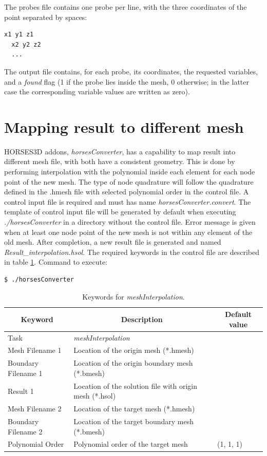 \documentclass[a4paper,10pt]{report}
\begin{document}
The probes file contains one probe per line, with the three coordinates of the point separated by spaces:

\begin{lstlisting}[language=bash]
  x1 y1 z1
  x2 y2 z2
  ...
\end{lstlisting}

The output file contains, for each probe, its coordinates, the requested variables, and a \textit{found} flag (1 if the probe lies inside the mesh, 0 otherwise; in the latter case the corresponding variable values are written as zero).


\section{Mapping result to different mesh} \label{tab:meshInterpolation}
HORSES3D addons, \textit{horsesConverter}, has a capability to map result into different mesh file, with both have a consistent geometry. This is done by performing interpolation with the polynomial inside each element for each node point of the new mesh. The type of node quadrature will follow the quadrature defined in the .hmesh file with selected polynomial order in the control file. A control input file is required and must has name \textit{horsesConverter.convert}. The template of control input file will be generated by default when executing \textit{./horsesConverter} in a directory without the control file. Error message is given when at least one node point of the new mesh is not within any element of the old mesh. After completion, a new result file is generated and named \textit{Result\_interpolation.hsol}. The required keywords in the control file are described in table \ref{tab:mappingresult}. Command to execute:

\begin{lstlisting}[language=bash]
	$ ./horsesConverter
\end{lstlisting}

\begin{longtable}{|p{4cm}|p{10cm}|p{2.2cm}|}
\caption{Keywords for \textit{meshInterpolation}.} \label{tab:mappingresult} \\
\hline
\multicolumn{1}{|c|}{\textbf{Keyword}} & \multicolumn{1}{c|}{\textbf{Description}} & \multicolumn{1}{c|}{\textbf{Default value}} \\ \hline
\endfirsthead

Task 	        		& \textit{meshInterpolation} 						&  \\ \hline
Mesh Filename 1 		& Location of the origin mesh (*.hmesh) 	&  \\ \hline
Boundary Filename 1 	& Location of the origin boundary mesh (*.bmesh) 	&  \\ \hline
Result 1 			& Location of the solution file with origin mesh (*.hsol) 	&  \\ \hline
Mesh Filename 2 		& Location of the target mesh (*.hmesh) 	&  \\ \hline
Boundary Filename 2 	& Location of the target boundary mesh (*.bmesh) 	&  \\ \hline
Polynomial Order 	& Polynomial order of the target mesh 	& (1, 1, 1) \\ \hline
\end{longtable}
\end{document}
